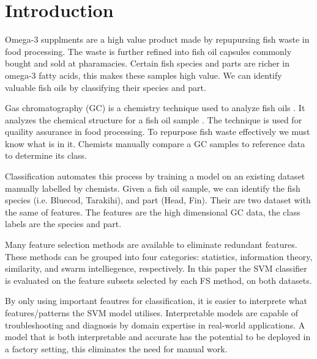 \documentclass[runningheads]{llncs}
\begin{document}
\section{Introduction}
\label{introduction}


Omega-3 supplments are a high value product made by repupursing fish waste in food processing. 
The waste is further refined into fish oil capsules commonly bought and sold at pharamacies. 
Certain fish species and parts are richer in omega-3 fatty acids, this makes these samples high value. 
We can identify valuable fish oils by classifying their species and part.

Gas chromatography (GC) is a chemistry technique used to analyze fish oils \cite{eder1995gas}. 
It analyzes the chemical structure for a fish oil sample \cite{restek2018high}. 
The technique is used for quaility assurance in food processing. 
To repurpose fish waste effectively we must know what is in it. 
Chemists manually compare a GC samples to reference data to determine its class. 

Classification automates this process by training a model on an existing dataset manually labelled by chemists. 
Given a fish oil sample, we can identify the fish species (i.e. Bluecod, Tarakihi), and part (Head, Fin).
Their are two dataset with the same of features. 
The features are the high dimensional GC data, the class labels are the species and part. 

Many feature selection methods \cite{liu1995chi2,ding2005minimum,kononenko1994estimating,kennedy1995particle} are available to eliminate redundant features. 
These methods can be grouped into four categories: statistics, information theory, similarity, and swarm intelliegence, respectively. 
In this paper the SVM classifier \cite{cortes1995support} is evaluated on the feature subsets selected by each FS method, on both datasets. 

By only using important feautres for classification, it is easier to interprete what features/patterns the SVM model utilises. 
Interpretable models are capable of troubleshooting and diagnosis by domain expertise in real-world applications.
A model that is both interpretable and accurate has the potential to be deployed in a factory setting, this eliminates the need for manual work.
\end{document}

